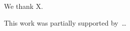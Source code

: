 \documentclass{article}
\numberwithin{equation}{section}
\numberwithin{equation}{section}
\begin{document}
	


\begin{abstract}
\ldots
\end{abstract}

\maketitle










\begin{ack}
We thank X.
\end{ack}

\begin{funding}
This work was partially supported by~\ldots
\end{funding}

\end{document}
